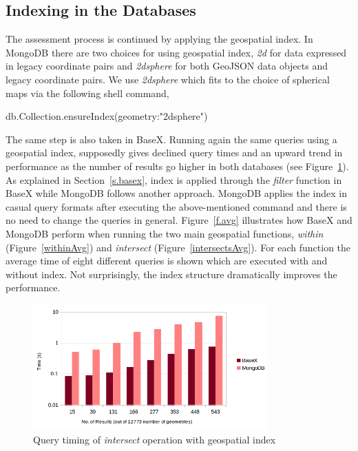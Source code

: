 \documentclass[a4paper,12pt]{article}
\begin{document}
\subsection{Indexing in the Databases}
\label{index}
The assessment process is continued by applying the geospatial index. In MongoDB there are two choices for using geospatial index, \textit{2d} for data expressed in legacy coordinate pairs and \textit{2dsphere} for both GeoJSON data objects and legacy coordinate pairs. We use \textit{2dsphere} which fits to the choice of spherical maps via the following shell command,
\vspace{10px}
\begin{fakeJSON}
db.Collection.ensureIndex({geometry:"2dsphere"}) 
\end{fakeJSON}
\vspace{10px}
The same step is also taken in BaseX. Running again the same queries using a geospatial index, supposedly gives declined query times and an upward trend in performance as the number of results go higher in both databases (see Figure~\ref{figBXvsMongoIndexIntersects}). As explained in Section~\ref{s.basex}, index is applied through the \textit{filter} function in BaseX while MongoDB follows another approach. MongoDB applies the index in casual query formats after executing the above-mentioned command and there is no need to change the queries in general. Figure~\ref{f.avg} illustrates how BaseX and MongoDB perform when running the two main geospatial functions, \textit{within} (Figure~\ref{withinAvg}) and \textit{intersect} (Figure~\ref{intersectsAvg}). For each function the average time of eight different queries is shown which are executed with and without index. Not surprisingly, the index structure dramatically improves the performance.

\begin{figure}
\centering
\includegraphics[width=0.8\textwidth]{BXvsMongo-Intersects-Index-Sec-log}
\caption{Query timing of \textit{intersect} operation with geospatial index}
\label{figBXvsMongoIndexIntersects}
\end{figure}
\end{document}
